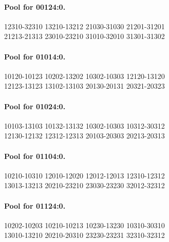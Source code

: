 \documentclass[11pt]{article}
\theoremstyle{remark}
\numberwithin{equation}{section}
\begin{document}
\paragraph{Pool for 00124:0.}
\begingroup\footnotesize\ttfamily\begin{flushleft}
12310-32310 13210-13212 21030-31030 21201-31201\\
21213-21313 23010-23210 31010-32010 31301-31302\\
\end{flushleft}\endgroup
\paragraph{Pool for 01014:0.}
\begingroup\footnotesize\ttfamily\begin{flushleft}
10120-10123 10202-13202 10302-10303 12120-13120\\
12123-13123 13102-13103 20130-20131 20321-20323\\
\end{flushleft}\endgroup
\paragraph{Pool for 01024:0.}
\begingroup\footnotesize\ttfamily\begin{flushleft}
10103-13103 10132-13132 10302-10303 10312-30312\\
12130-12132 12312-12313 20103-20303 20213-20313\\
\end{flushleft}\endgroup
\paragraph{Pool for 01104:0.}
\begingroup\footnotesize\ttfamily\begin{flushleft}
10210-10310 12010-12020 12012-12013 12310-12312\\
13013-13213 20210-23210 23030-23230 32012-32312\\
\end{flushleft}\endgroup
\paragraph{Pool for 01124:0.}
\begingroup\footnotesize\ttfamily\begin{flushleft}
10202-10203 10210-10213 10230-13230 10310-30310\\
13010-13210 20210-20310 23230-23231 32310-32312\\
\end{flushleft}\endgroup
\end{document}

